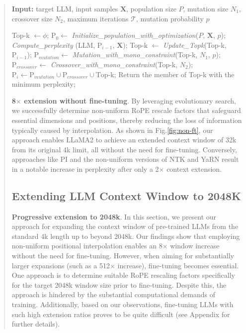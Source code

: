 \begin{abstract}
\begin{algorithm}[t]
	\small
	\caption{The search algorithm}
	\textbf{Input:} target LLM, input samples $\mathbf{X}$, population size $P$, mutation size $N_1$, crossover size $N_2$, maximum iterations $\mathcal{T}$, mutation probability $p$\\

	\begin{algorithmic}[1]
		\label{alg:search}
		\STATE Top-k $\leftarrow \phi$;
		\STATE $\text{P}_0 \leftarrow$ \textit{Initialize\_population\_with\_optimization}($P$, $\mathbf{X}$, $p$);
		\STATE \textit{Compute\_perplexity} (LLM, $\text{P}_{i-1}$, $\mathbf{X}$);
		\STATE Top-k $\leftarrow$ \textit{Update\_Topk}(Top-k, $\text{P}_{i-1}$);
		\STATE $\text{P}_{mutation} \leftarrow$ \textit{Mutation\_with\_mono\_constraint}(Top-k, $N_1$, $p$);
		\STATE $\text{P}_{crossover} \leftarrow$ \textit{Crossover\_with\_mono\_constraint}(Top-k, $N_2$);
		\STATE $\text{P}_i \leftarrow \text{P}_{mutation} \cup \text{P}_{crossover} \cup \text{Top-k}$;
		\ENDFOR
		\STATE Return the member of Top-k with the minimum perplexity;
	\end{algorithmic}
\end{algorithm}

\textbf{8$\times$ extension without fine-tuning}. By leveraging evolutionary search, we successfully determine non-uniform RoPE rescale factors that safeguard essential dimensions and positions, thereby reducing the loss of information typically caused by interpolation. As shown in Fig.\ref{fig:non-ft}, our approach enables LLaMA2 to achieve an extended context window of 32k from its original 4k limit, all without the need for fine-tuning. Conversely, approaches like PI and the non-uniform versions of NTK and YaRN result in a notable increase in perplexity after only a 2$\times$ context extension.

\subsection{Extending LLM Context Window to 2048K}
\label{sec:extendto2048k}

\textbf{Progressive extension to 2048k}. In this section, we present our approach for expanding the context window of pre-trained LLMs from the standard 4k length up to beyond 2048k. Our findings show that employing non-uniform positional interpolation enables an 8$\times$ window increase without the need for fine-tuning. However, when aiming for substantially larger expansions (such as a 512$\times$ increase), fine-tuning becomes essential. One approach is to determine suitable RoPE rescaling factors specifically for the target 2048k window size prior to fine-tuning. Despite this, the approach is hindered by the substantial computational demands of training. Additionally, based on our observations, fine-tuning LLMs with such high extension ratios proves to be quite difficult (see Appendix for further details).


\end{abstract}
